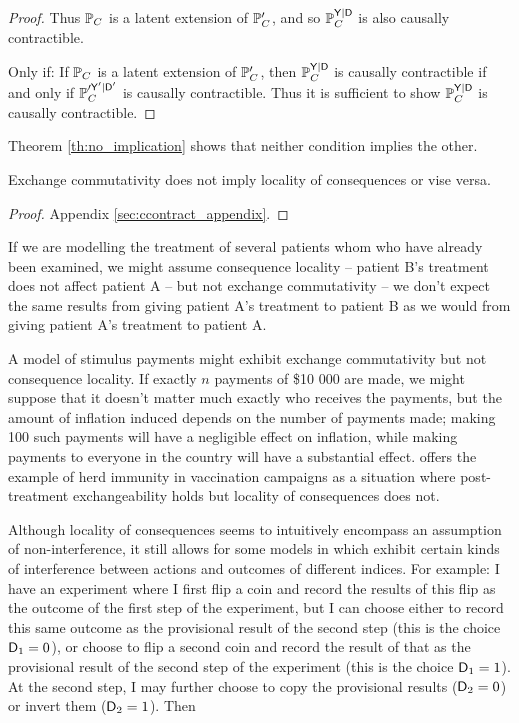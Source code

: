 \begin{proof}
Thus $\mathbb{P}_C$ is a latent extension of $\mathbb{P}_C'$, and so $\mathbb{P}_C^{\mathsf{Y}|\mathsf{D}}$ is also causally contractible.


Only if:
If $\mathbb{P}_C$ is a latent extension of $\mathbb{P}_C'$, then $\mathbb{P}_C^{\mathsf{Y}|\mathsf{D}}$ is causally contractible if and only if $\mathbb{P}_C^{\prime \mathsf{Y}'|\mathsf{D}'}$ is causally contractible. Thus it is sufficient to show $\mathbb{P}_C^{\mathsf{Y}|\mathsf{D}}$ is causally contractible.









\end{proof}


Theorem \ref{th:no_implication} shows that neither condition implies the other. 

\begin{theorem}\label{th:no_implication}
Exchange commutativity does not imply locality of consequences or vise versa.
\end{theorem}

\begin{proof}
Appendix \ref{sec:ccontract_appendix}.
\end{proof}

If we are modelling the treatment of several patients whom who have already been examined, we might assume consequence locality -- patient B's treatment does not affect patient A -- but not exchange commutativity -- we don't expect the same results from giving patient A's treatment to patient B as we would from giving patient A's treatment to patient A. 

A model of stimulus payments might exhibit exchange commutativity but not consequence locality. If exactly $n$ payments of \$10 000 are made, we might suppose that it doesn't matter much exactly who receives the payments, but the amount of inflation induced depends on the number of payments made; making 100 such payments will have a negligible effect on inflation, while making payments to everyone in the country will have a substantial effect. \citet{dawid_causal_2000} offers the example of herd immunity in vaccination campaigns as a situation where post-treatment exchangeability holds but locality of consequences does not.

Although locality of consequences seems to intuitively encompass an assumption of non-interference, it still allows for some models in which exhibit certain kinds of interference between actions and outcomes of different indices. For example: I have an experiment where I first flip a coin and record the results of this flip as the outcome of the first step of the experiment, but I can choose either to record this same outcome as the provisional result of the second step (this is the choice $\mathsf{D}_1=0$), or choose to flip a second coin and record the result of that as the provisional result of the second step of the experiment (this is the choice $\mathsf{D}_1=1$). At the second step, I may further choose to copy the provisional results ($\mathsf{D}_2=0$) or invert them ($\mathsf{D}_2=1$). Then


